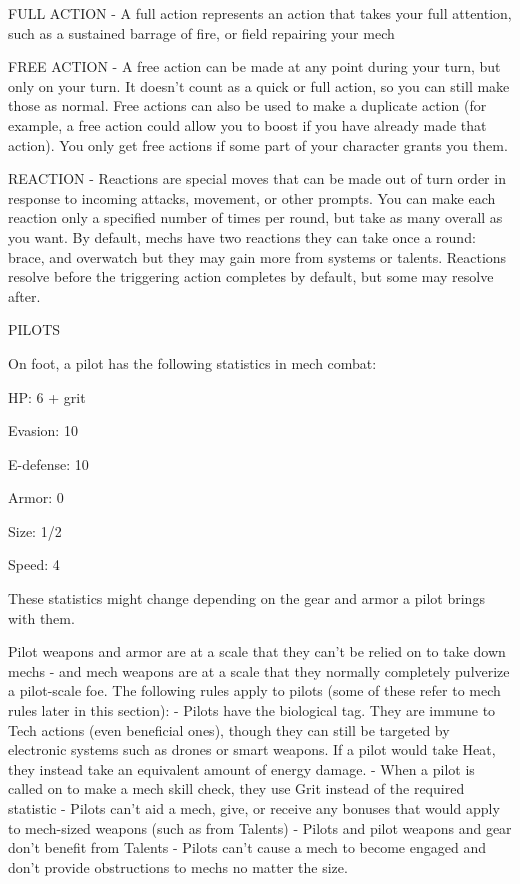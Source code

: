 FULL ACTION - A full action represents an action that takes your full attention, such as a  
sustained barrage of fire, or field repairing your mech
 
FREE ACTION - A free action can be made at any point during your turn, but only on your turn. It  
doesn’t count as a quick or full action, so you can still make those as normal. Free actions can  
also be used to make a duplicate action (for example, a free action could allow you to boost if  
you have already made that action). You only get free actions if some part of your character  
grants you them.
 
REACTION - Reactions are special moves that can be made out of turn order in response to  
incoming attacks, movement, or other prompts. You can make each reaction only a specified  
number of times per round, but take as many overall as you want. By default, mechs have two  
reactions they can take once a round: brace, and overwatch but they may gain more from  
systems or talents. Reactions resolve before the triggering action completes by default, but  
some may resolve after.
 

                                                      PILOTS
 
On foot, a pilot has the following statistics in mech combat:
 
	        HP: 6 + grit
 
	        Evasion: 10
 
         E-defense: 10
 
	        Armor: 0
 
	        Size: 1/2
 

                                                                                                                  


	        Speed: 4
 

These statistics might change depending on the gear and armor a pilot brings with them.
 

Pilot weapons and armor are at a scale that they can’t be relied on to take down mechs - and  
mech weapons are at a scale that they normally completely pulverize a pilot-scale foe. The  
following rules apply to pilots (some of these refer to mech rules later in this section):  
     -   Pilots have the biological tag. They are immune to Tech actions (even beneficial ones),  
         though they can still be targeted by electronic systems such as drones or smart weapons.  
         If a pilot would take Heat, they instead take an equivalent amount of energy damage.  
     -   When a pilot is called on to make a mech skill check, they use Grit instead of the required  
         statistic  
     -   Pilots can’t aid a mech, give, or receive any bonuses that would apply to mech-sized  
         weapons (such as from Talents)  
     -   Pilots and pilot weapons and gear don’t benefit from Talents  
     -   Pilots can’t cause a mech to become engaged and don’t provide obstructions to mechs no  
         matter the size.  

